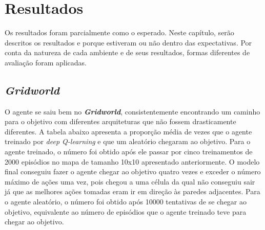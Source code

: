 
\chapter{Resultados}
\label{cap:resultados}

Os resultados foram parcialmente como o esperado.
Neste capítulo, serão descritos os resultados e porque estiveram ou não dentro das expectativas.
Por conta da natureza de cada ambiente e de seus resultados, formas diferentes de avaliação foram aplicadas.

\section{\textit{Gridworld}}
\label{sec:res_gridworld}

O agente se saiu bem no \textbf{\textit{Gridworld}}, consistentemente encontrando um caminho para o objetivo com diferentes arquiteturas que não fossem drasticamente diferentes.
A tabela abaixo apresenta a proporção média de vezes que o agente treinado por \textit{deep Q-learning} e que um aleatório chegaram ao objetivo.
Para o agente treinado, o número foi obtido após ele passar por cinco treinamentos de 2000 episódios no mapa de tamanho 10x10 apresentado anteriormente.
O modelo final conseguiu fazer o agente chegar ao objetivo quatro vezes e exceder o número máximo de ações uma vez, pois chegou a uma célula da qual não conseguiu sair já que as melhores ações tomadas eram ir em direção às paredes adjacentes.
Para o agente aleatório, o número foi obtido após 10000 tentativas de se chegar ao objetivo, equivalente ao número de episódios que o agente treinado teve para chegar ao objetivo.



